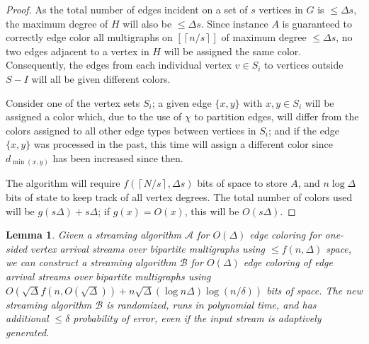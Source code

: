 \documentclass[10pt]{article}
\newtheorem{lemma}[theorem]{Lemma}
\theoremstyle{definition}\newtheorem{definition}[lemma]{Definition}
\theoremstyle{remark}  \newtheorem*{remark}{Remark}
\newcommand{\cA}{\mathcal{A}}
\newcommand{\cB}{\mathcal{B}}
\newcommand{\ceil}[1]{{\left\lceil{#1}\right\rceil}}
\begin{document}
\begin{proof}
  As the total number of edges incident on a set of $s$ vertices in $G$ is $\le \Delta s$,
  the maximum degree of $H$ will also be $\le \Delta s$. Since instance $A$ is guaranteed
  to correctly edge color all multigraphs on $[\ceil{n / s}]$ of maximum degree $\le \Delta s$,
  no two edges adjacent to a vertex in $H$ will be assigned the same color. Consequently, the
  edges from each individual vertex $v \in S_i$ to vertices outside $S-I$ will all be 
  given different colors.
  
  Consider one of the vertex sets $S_i$; a given edge $\{x,y\}$ with $x,y\in S_i$
  will be assigned a color which, due to the use of $\chi$ to partition edges, will differ from the colors assigned to all other edge
  types between vertices in $S_i$; and if the edge $\{x,y\}$ was processed in the past,
  this time will assign a different color since $d_{\min(x,y)}$ has been increased since then.
  
  The algorithm will require $f(\ceil{N/s}, \Delta s)$ bits of space to store $A$, and
  $n \log \Delta$ bits of state to keep track of all vertex degrees. The total number of
  colors used will be $g(s \Delta) + s \Delta$; if $g(x) = O(x)$, this will be $O(s \Delta)$.
  
\end{proof}


\begin{lemma}\label{lem:va-to-ea-conversion}
  Given a streaming algorithm $\cA$ for $O(\Delta)$ edge coloring for one-sided vertex
  arrival streams over bipartite multigraphs using $\le f(n, \Delta)$ space, we
  can construct a streaming algorithm $\cB$ for $O(\Delta)$
  edge coloring of edge arrival streams over bipartite multigraphs using 
  $O(\sqrt{\Delta} f(n, O(\sqrt{\Delta})) + n \sqrt{\Delta} (\log n \Delta) \log(n/\delta))$ bits of space. The new streaming algorithm
  $\cB$ is randomized, runs in polynomial time, and has additional $\le \delta$ probability of error,
  even if the input stream is adaptively generated.
\end{lemma}
\end{document}
